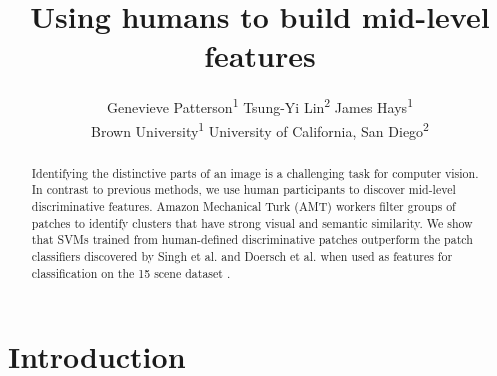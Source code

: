 \documentclass[10pt,twocolumn,letterpaper]{article}
\title{\vspace{-5ex}Using humans to build mid-level features\vspace{-3ex}}
\author{Genevieve Patterson\textsuperscript{1} \quad Tsung-Yi Lin\textsuperscript{2} \quad James Hays\textsuperscript{1}\\
 Brown University\textsuperscript{1} \quad University of California, San Diego\textsuperscript{2}}
\begin{document}
\maketitle
\begin{abstract}
  Identifying the distinctive parts of an image is a challenging task for computer vision. In contrast to previous methods, we use human participants to discover mid-level discriminative features. Amazon Mechanical Turk (AMT) workers filter groups of patches to identify clusters that have strong visual and semantic similarity.  We show that SVMs trained from human-defined discriminative patches outperform the patch classifiers discovered by Singh et al. and Doersch et al. \cite{singh2012unsupervised, doersch2012makes} when used as features for classification on the 15 scene dataset \cite{lazebnik2006beyond}.

\end{abstract}

\section{Introduction}
%
\end{document}
